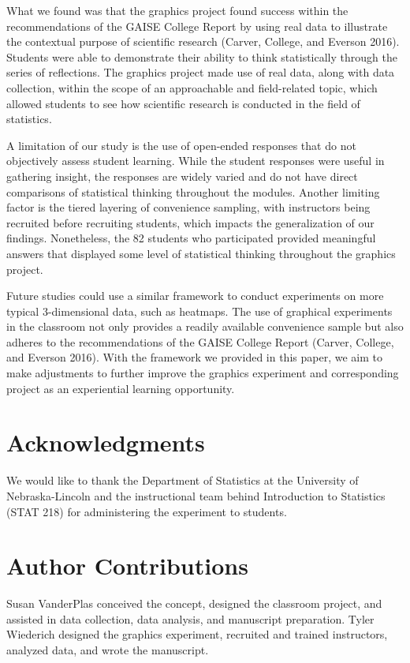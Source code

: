 \documentclass[
  12pt,
]{article}
\begin{document}
What we found was that the graphics project found success within the
recommendations of the GAISE College Report by using real data to
illustrate the contextual purpose of scientific research (Carver,
College, and Everson 2016). Students were able to demonstrate their
ability to think statistically through the series of reflections. The
graphics project made use of real data, along with data collection,
within the scope of an approachable and field-related topic, which
allowed students to see how scientific research is conducted in the
field of statistics.

A limitation of our study is the use of open-ended responses that do not
objectively assess student learning. While the student responses were
useful in gathering insight, the responses are widely varied and do not
have direct comparisons of statistical thinking throughout the modules.
Another limiting factor is the tiered layering of convenience sampling,
with instructors being recruited before recruiting students, which
impacts the generalization of our findings. Nonetheless, the 82 students
who participated provided meaningful answers that displayed some level
of statistical thinking throughout the graphics project.

Future studies could use a similar framework to conduct experiments on
more typical 3-dimensional data, such as heatmaps. The use of graphical
experiments in the classroom not only provides a readily available
convenience sample but also adheres to the recommendations of the GAISE
College Report (Carver, College, and Everson 2016). With the framework
we provided in this paper, we aim to make adjustments to further improve
the graphics experiment and corresponding project as an experiential
learning opportunity.

\section{Acknowledgments}\label{acknowledgments}

We would like to thank the Department of Statistics at the University of
Nebraska-Lincoln and the instructional team behind Introduction to
Statistics (STAT 218) for administering the experiment to students.

\section{Author Contributions}\label{author-contributions}

Susan VanderPlas conceived the concept, designed the classroom project,
and assisted in data collection, data analysis, and manuscript
preparation. Tyler Wiederich designed the graphics experiment, recruited
and trained instructors, analyzed data, and wrote the manuscript.
\end{document}
